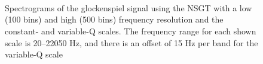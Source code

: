 \documentclass[report.tex]{subfiles}
\begin{document}
\begin{figure}[ht]
	\centering
	\\
	\\
	\\
	\caption{Spectrograms of the glockenspiel signal using the NSGT with a low (100 bins) and high (500 bins) frequency resolution and the constant- and variable-Q scales. The frequency range for each shown scale is 20--22050 Hz, and there is an offset of 15 Hz per band for the variable-Q scale}
	\label{fig:bunchansgts1}
\end{figure}
\end{document}
